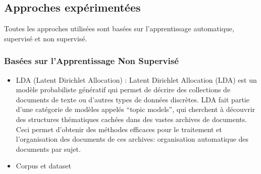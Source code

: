     \subsection{Approches expérimentées\label{approches}}
    Toutes les approches utilisées sont basées sur l'apprentissage automatique, supervisé et non supervisé. 

    \subsubsection{Basées sur l'Apprentissage Non Supervisé}
        
        \begin{itemize}
            \item{LDA (Latent Dirichlet Allocation) : }
            Latent Dirichlet Allocation (LDA) est un modèle probabiliste génératif qui permet de décrire des collections de documents de texte ou d’autres types de données discrètes. LDA fait partie d’une catégorie de modèles appelés “topic models”, qui cherchent à découvrir des structures thématiques cachées dans des vastes archives de documents. Ceci permet d’obtenir des méthodes efficaces pour le traitement et l’organisation des documents de ces archives: organisation automatique des documents par sujet.
        \end{itemize}
        
        \begin{itemize}
            \item{Corpus et dataset}
        \end{itemize}
        
